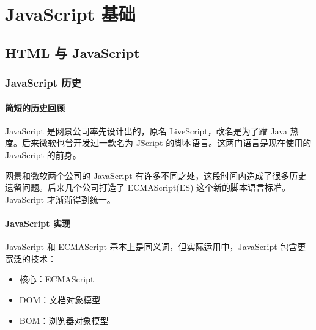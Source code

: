 \part{JavaScript 基础}
\chapter{HTML 与 JavaScript}
\section{JavaScript 历史}
\subsection{简短的历史回顾}

JavaScript 是网景公司率先设计出的，原名 LiveScript，改名是为了蹭 Java 热度。后来微软也曾开发过一款名为 JScript 的脚本语言。这两门语言是现在使用的 JavaScript 的前身。

网景和微软两个公司的 JavaScript 有许多不同之处，这段时间内造成了很多历史遗留问题。后来几个公司打造了 ECMAScript(ES) 这个新的脚本语言标准。JavaScript 才渐渐得到统一。

\subsection{JavaScript 实现}

JavaScript 和 ECMAScript 基本上是同义词，但实际运用中，JavaScript 包含更宽泛的技术：
\begin{itemize}
    \item 核心：ECMAScript
    \item DOM：文档对象模型
    \item BOM：浏览器对象模型
\end{itemize}